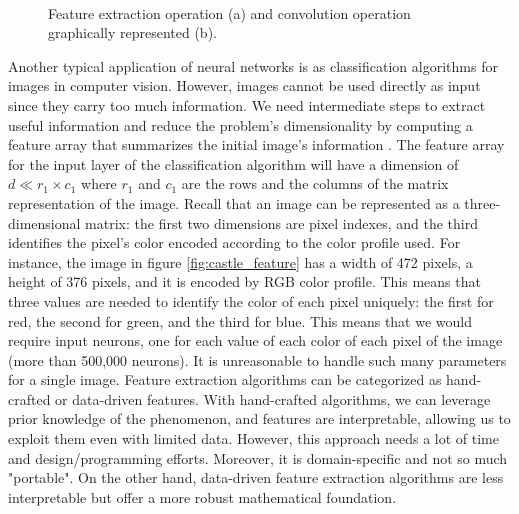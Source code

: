 \begin{figure}
    \centering
    \\
    \caption[Convolution operation.]{Feature extraction operation (a) and convolution operation graphically represented (b)\cite{giacomo_boracchi_convolutional_2021}.}
\end{figure}
Another typical application of neural networks is as classification algorithms for images in computer vision. However, images cannot be used directly as input since they carry too much information. We need intermediate steps to extract useful information and reduce the problem's dimensionality by computing a feature array that summarizes the initial image's information \cite{giacomo_boracchi_convolutional_2021}. The feature array for the input layer of the classification algorithm will have a dimension of $d\ll r_1 \times c_1$ where $r_1$ and $c_1$ are the rows and the columns of the matrix representation of the image. Recall that an image can be represented as a three-dimensional matrix: the first two dimensions are pixel indexes, and the third identifies the pixel's color encoded according to the color profile used. For instance, the image in figure \ref{fig:castle_feature} has a width of 472 pixels, a height of 376 pixels, and it is encoded by RGB color profile. This means that three values are needed to identify the color of each pixel uniquely: the first for red, the second for green, and the third for blue. This means that we would require  input neurons, one for each value of each color of each pixel of the image (more than 500,000 neurons). It is unreasonable to handle such many parameters for a single image. Feature extraction algorithms can be categorized as hand-crafted or data-driven features. With hand-crafted algorithms, we can leverage prior knowledge of the phenomenon, and features are interpretable, allowing us to exploit them even with limited data. However, this approach needs a lot of time and design/programming efforts. Moreover, it is domain-specific and not so much "portable". On the other hand, data-driven feature extraction algorithms are less interpretable but offer a more robust mathematical foundation. 
